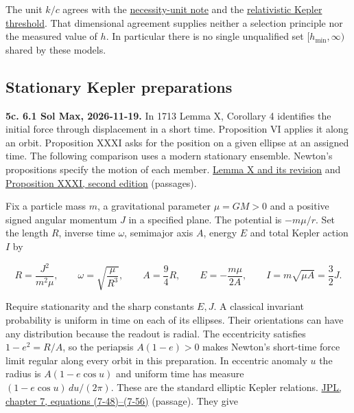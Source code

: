 \documentclass[11pt,a4paper]{article}
\begin{document}
The unit \(k/c\) agrees with the
\href{necessity-unit-and-indeterminacy.md}{necessity-unit note} and the
\href{action-unit-dimensional-selection.md\#singular-and-softened-relativistic-coulomb-cores}{relativistic
Kepler threshold}. That dimensional agreement supplies neither a
selection principle nor the measured value of \(h\). In particular there
is no single unqualified set \([h_{\min},\infty)\) shared by these
models.

\subsection{Stationary Kepler
preparations}\label{stationary-kepler-preparations}

\textbf{5c. 6.1 Sol Max, 2026-11-19.} In 1713 Lemma X, Corollary 4
identifies the initial force through displacement in a short time.
Proposition VI applies it along an orbit. Proposition XXXI asks for the
position on a given ellipse at an assigned time. The following
comparison uses a modern stationary ensemble. Newton's propositions
specify the motion of each member.
\href{newton-insertion-action.md\#lemma-x-and-the-measurement-of-initial-force}{Lemma
X and its revision} and
\href{https://www.newtonproject.ox.ac.uk/view/texts/diplomatic/NATP00082\#par286}{Proposition
XXXI, second edition} (passages).

Fix a particle mass \(m\), a gravitational parameter \(\mu=GM>0\) and a
positive signed angular momentum \(J\) in a specified plane. The
potential is \(-m\mu/r\). Set the length \(R\), inverse time \(\omega\),
semimajor axis \(A\), energy \(E\) and total Kepler action \(I\) by

\[
 R=\frac{J^2}{m^2\mu},\qquad \omega=\sqrt{\frac{\mu}{R^3}},\qquad
 A=\frac94R,\qquad E=-\frac{m\mu}{2A},\qquad I=m\sqrt{\mu A}=\frac32J .
\]

Require stationarity and the sharp constants \(E,J\). A classical
invariant probability is uniform in time on each of its ellipses. Their
orientations can have any distribution because the readout is radial.
The eccentricity satisfies \(1-e^2=R/A\), so the periapsis \(A(1-e)>0\)
makes Newton's short-time force limit regular along every orbit in this
preparation. In eccentric anomaly \(u\) the radius is \(A(1-e\cos u)\)
and uniform time has measure \((1-e\cos u)\,du/(2\pi)\). These are the
standard elliptic Kepler relations.
\href{https://spsweb.fltops.jpl.nasa.gov/portaldataops/mpg/MPG_Docs/MPG\%20Book/Release/Chapter7-OrbitalMechanics.pdf}{JPL,
chapter 7, equations (7-48)--(7-56)} (passage). They give
\end{document}
